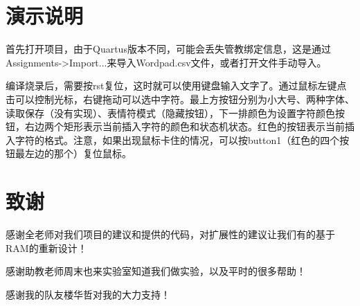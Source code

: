 \documentclass[12pt,a4paper]{article}
\begin{document}
\section{演示说明} %
\label{sec:演示说明}
首先打开项目，由于Quartus版本不同，可能会丢失管教绑定信息，这是通过Assignments->Import...来导入Wordpad.csv文件，或者打开文件手动导入。

编译烧录后，需要按rst复位，这时就可以使用键盘输入文字了。通过鼠标左键点击可以控制光标，右键拖动可以选中字符。最上方按钮分别为小大号、两种字体、读取保存（没有实现）、表情符模式（隐藏按钮），下一排颜色为设置字符颜色按钮，右边两个矩形表示当前插入字符的颜色和状态机状态。红色的按钮表示当前插入字符的格式。注意，如果出现鼠标卡住的情况，可以按button1（红色的四个按钮最左边的那个）复位鼠标。


\section{致谢} %
\label{sec:致谢}
感谢全老师对我们项目的建议和提供的代码，对扩展性的建议让我们有的基于RAM的重新设计！

感谢助教老师周末也来实验室知道我们做实验，以及平时的很多帮助！

感谢我的队友楼华哲对我的大力支持！

\end{document}
